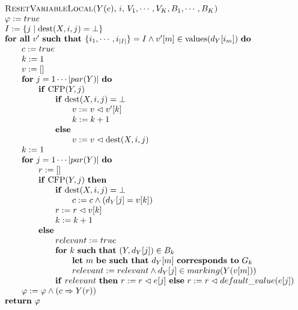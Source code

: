 \documentclass{article}
\begin{document}
\begin{equation*}
\begin{tabular}{l}
\textsc{ResetVariableLocal(}$Y(e)$, $i,$ $V_{1},\cdots ,V_{K},B_{1},\cdots
,B_{K}$\textsc{)} \\ 
$\varphi :=true$ \\ 
$I:=\{j\mid \mathrm{dest}(X,i,j)=\bot \}$ \\ 
\textbf{for all} $v^{\prime }$ \textbf{such that }$\{i_{1},\cdots
,i_{\left\vert I\right\vert }\}=I\wedge v^{\prime }[m]\in \mathrm{values}%
(d_{Y}[i_{m}])$ \textbf{do} \\ 
$\qquad c:=true$ \\ 
$\qquad k:=1$ \\ 
$\qquad v:=[]$ \\ 
$\qquad $\textbf{for} $j=1\cdots \left\vert par(Y)\right\vert $ \textbf{do}
\\ 
$\qquad \qquad $\textbf{if} $\mathrm{CFP}(Y,j)$ \\ 
$\qquad \qquad \qquad $\textbf{if} $\mathrm{dest}(X,i,j)=\bot $ \\ 
$\qquad \qquad \qquad \qquad v:=v\vartriangleleft v^{\prime }[k]$ \\ 
$\qquad \qquad \qquad \qquad k:=k+1$ \\ 
$\qquad \qquad \qquad $\textbf{else} \\ 
$\qquad \qquad \qquad \qquad v:=v\vartriangleleft \mathrm{dest}(X,i,j)$ \\ 
$\qquad k:=1$ \\ 
$\qquad $\textbf{for} $j=1\cdots \left\vert par(Y)\right\vert $ \textbf{do}
\\ 
$\qquad \qquad r:=[]$ \\ 
$\qquad \qquad $\textbf{if} $\mathrm{CFP}(Y,j)$ \textbf{then} \\ 
$\qquad \qquad \qquad $\textbf{if} $\mathrm{dest}(X,i,j)=\bot $ \\ 
$\qquad \qquad \qquad \qquad c:=c\wedge (d_{Y}[j]=v[k])$ \\ 
$\qquad \qquad \qquad r:=r\vartriangleleft v[k]$ \\ 
$\qquad \qquad \qquad k:=k+1$ \\ 
$\qquad \qquad $\textbf{else} \\ 
$\qquad \qquad \qquad relevant:=true$ \\ 
$\qquad \qquad \qquad $\textbf{for} $k$ \textbf{such} \textbf{that} $%
(Y,d_{Y}[j])\in B_{k}$ \\ 
$\qquad \qquad \qquad \qquad $\textbf{let} $m$ \textbf{be such that} $%
d_{Y}[m]$ \textbf{corresponds to} $G_{k}$ \\ 
$\qquad \qquad \qquad \qquad relevant:=relevant\wedge d_{Y}[j]\in
marking(Y(v[m]))$ \\ 
$\qquad \qquad \qquad $\textbf{if} $relevant$ \textbf{then} $%
r:=r\vartriangleleft e[j]$ \textbf{else} $r:=r\vartriangleleft
default\_value(e[j])$ \\ 
$\qquad \varphi :=\varphi \wedge (c\Rightarrow Y(r))$ \\ 
\textbf{return} $\varphi $%
\end{tabular}%
\end{equation*}
\end{document}

